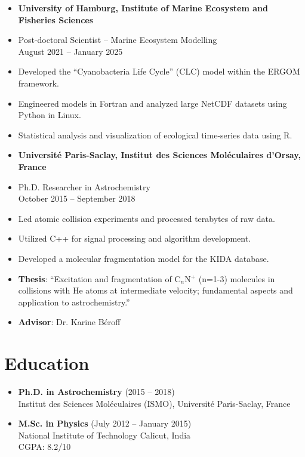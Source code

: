 \documentclass[margin,line,pifont,palatino,courier]{res}
\begin{document}
\begin{resume}
\begin{itemize}
\item {\bf University of Hamburg, Institute of Marine Ecosystem and Fisheries Sciences}\\
\vspace*{-.2in}
\item[] Post-doctoral Scientist -- Marine Ecosystem Modelling\\
August 2021 -- January 2025
\vspace*{.1in}
\item[-] Developed the ``Cyanobacteria Life Cycle'' (CLC) model within the ERGOM framework.
\item[-] Engineered models in Fortran and analyzed large NetCDF datasets using Python in Linux.
\item[-] Statistical analysis and visualization of ecological time-series data using R.
\end{itemize}
\vspace*{.1in}

\begin{itemize}
\item {\bf Universit\'e Paris-Saclay, Institut des Sciences Mol\'eculaires d'Orsay, France}\\
\vspace*{-.2in}
\item[] Ph.D. Researcher in Astrochemistry\\
October 2015 -- September 2018
\vspace*{.1in}
\item[-] Led atomic collision experiments and processed terabytes of raw data.
\item[-] Utilized C++ for signal processing and algorithm development.
\item[-] Developed a molecular fragmentation model for the KIDA database.
\item[-] {\bf Thesis}: ``Excitation and fragmentation of C${}_n$N${}^+$ (n=1-3) molecules in collisions with He atoms at intermediate velocity; fundamental aspects and application to astrochemistry.''
\item[-] {\bf Advisor}: Dr. Karine B\'eroff
\end{itemize}

\section{\sc Education}

\begin{itemize}
\item {\bf Ph.D. in Astrochemistry} (2015 -- 2018)\\
Institut des Sciences Mol\'eculaires (ISMO), Universit\'e Paris-Saclay, France
\vspace*{.1in}
\item {\bf M.Sc. in Physics} (July 2012 -- January 2015)\\
National Institute of Technology Calicut, India\\
CGPA: 8.2/10
\end{itemize}


\end{resume}
\end{document}
